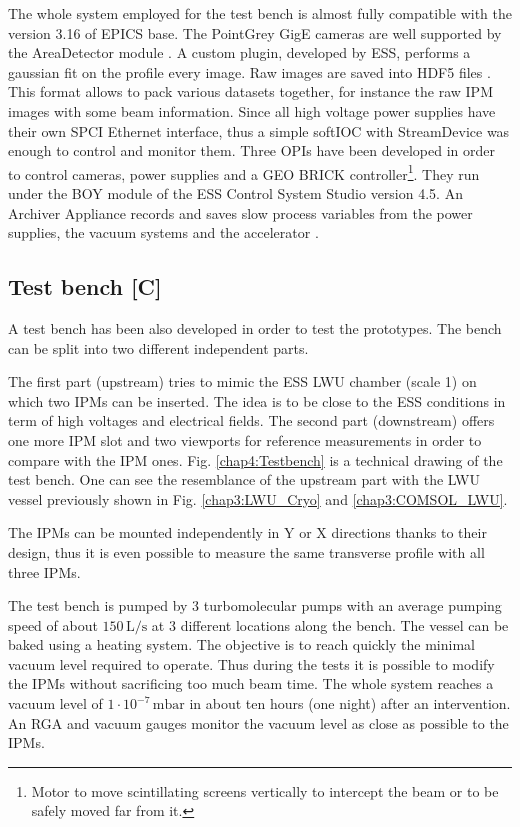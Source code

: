\begin{refsection}
  The whole system employed for the test bench is almost fully compatible with the version 3.16 of EPICS base. The PointGrey GigE cameras are well supported by the AreaDetector module \cite{ad2019}. A custom plugin, developed by ESS, performs a gaussian fit on the profile every image. Raw images are saved into HDF5 files \cite{hdf5}. This format allows to pack  various datasets together, for instance the raw IPM images with some beam information.
  Since all high voltage power supplies have their own SPCI Ethernet interface, thus a simple softIOC with StreamDevice\cite{streamdevice2019} was enough to control and monitor them.
  Three OPIs have been developed in order to control cameras, power supplies and a GEO BRICK controller\footnote{Motor to move scintillating screens vertically to intercept the beam or to be safely moved far from it.}. They run under the BOY module of the ESS Control System Studio version 4.5. An Archiver Appliance records and saves slow process variables from the power supplies, the vacuum systems and the accelerator \cite{archiver2019}.


  

  \subsection{Test bench [C]}
  A test bench has been also developed in order to test the prototypes. The bench can be split into two different independent parts.

  The first part (upstream) tries to mimic the ESS LWU chamber (scale 1) on which two IPMs can be inserted. The idea is to be close to the ESS conditions in term of high voltages and electrical fields. The second part (downstream) offers one more IPM slot and two viewports for reference measurements in order to compare with the IPM ones. Fig. \ref{chap4:Testbench} is a technical drawing of the test bench. One can see the resemblance of the upstream part with the LWU vessel previously shown in Fig. \ref{chap3:LWU_Cryo} and \ref{chap3:COMSOL_LWU}.


  The IPMs can be mounted independently in Y or X directions thanks to their design, thus it is even possible to measure the same transverse profile with all three IPMs.

  

  The test bench is pumped by 3 turbomolecular pumps with an average pumping speed of about $150\,\mathrm{L/s}$ at 3 different locations along the bench. The vessel can be baked using a heating system. The objective is to reach quickly the minimal vacuum level required to operate. Thus during the tests it is possible to modify the IPMs without sacrificing too much beam time. The whole system reaches a vacuum level of $1\cdot 10^{-7}\,\mathrm{mbar}$ in about ten hours (one night) after an intervention. An RGA and vacuum gauges monitor the vacuum level as close as possible to the IPMs.


\end{refsection}
